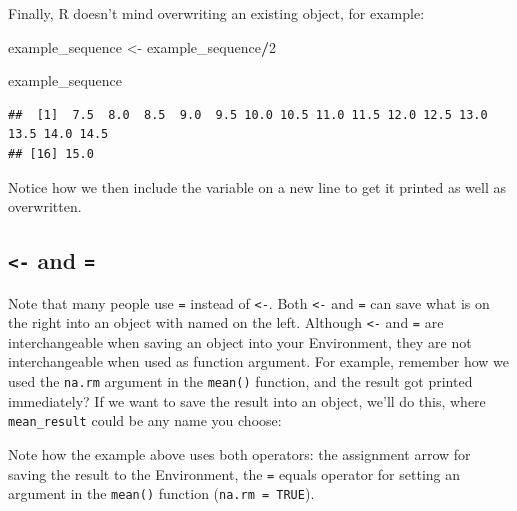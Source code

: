 \documentclass[
  12pt,
  krantz2]{krantz}
\makeatletter
\newenvironment{Shaded}{\begin{snugshade}}{\end{snugshade}}
\newcommand{\DataTypeTok}[1]{\textcolor[rgb]{0.13,0.29,0.53}{#1}}
\newcommand{\DecValTok}[1]{\textcolor[rgb]{0.00,0.00,0.81}{#1}}
\newcommand{\KeywordTok}[1]{\textcolor[rgb]{0.13,0.29,0.53}{\textbf{#1}}}
\newcommand{\NormalTok}[1]{#1}
\newcommand{\OperatorTok}[1]{\textcolor[rgb]{0.81,0.36,0.00}{\textbf{#1}}}
\newcommand{\OtherTok}[1]{\textcolor[rgb]{0.56,0.35,0.01}{#1}}
\newcommand{\StringTok}[1]{\textcolor[rgb]{0.31,0.60,0.02}{#1}}
\newenvironment{kframe}{%
\medskip{}
\setlength{\fboxsep}{.8em}
 \def\at@end@of@kframe{}%
 \ifinner\ifhmode%
  \def\at@end@of@kframe{\end{minipage}}%
  \begin{minipage}{\columnwidth}%
 \fi\fi%
 \def\FrameCommand##1{\hskip\@totalleftmargin \hskip-\fboxsep
 \colorbox{shadecolor}{##1}\hskip-\fboxsep
     \hskip-\linewidth \hskip-\@totalleftmargin \hskip\columnwidth}%
 \MakeFramed {\advance\hsize-\width
   \@totalleftmargin\z@ \linewidth\hsize
   \@setminipage}}%
 {\par\unskip\endMakeFramed%
 \at@end@of@kframe}
\renewenvironment{Shaded}{\begin{kframe}}{\end{kframe}}
\makeatother
\begin{document}
Finally, R doesn't mind overwriting an existing object, for example:

\begin{Shaded}
\begin{Highlighting}[]
\NormalTok{example_sequence <-}\StringTok{ }\NormalTok{example_sequence}\OperatorTok{/}\DecValTok{2}

\NormalTok{example_sequence}
\end{Highlighting}
\end{Shaded}

\begin{verbatim}
##  [1]  7.5  8.0  8.5  9.0  9.5 10.0 10.5 11.0 11.5 12.0 12.5 13.0 13.5 14.0 14.5
## [16] 15.0
\end{verbatim}

Notice how we then include the variable on a new line to get it printed as well as overwritten.

\hypertarget{and}{%
\subsection{\texorpdfstring{\texttt{\textless{}-} and \texttt{=}}{\textless- and =}}\label{and}}

Note that many people use \texttt{=} instead of \texttt{\textless{}-}.
Both \texttt{\textless{}-} and \texttt{=} can save what is on the right into an object with named on the left.
Although \texttt{\textless{}-} and \texttt{=} are interchangeable when saving an object into your Environment, they are not interchangeable when used as function argument.
For example, remember how we used the \texttt{na.rm} argument in the \texttt{mean()} function, and the result got printed immediately?
If we want to save the result into an object, we'll do this, where \texttt{mean\_result} could be any name you choose:

\begin{Shaded}
\end{Shaded}

Note how the example above uses both operators: the assignment arrow for saving the result to the Environment, the \texttt{=} equals operator for setting an argument in the \texttt{mean()} function (\texttt{na.rm\ =\ TRUE}).
\end{document}
